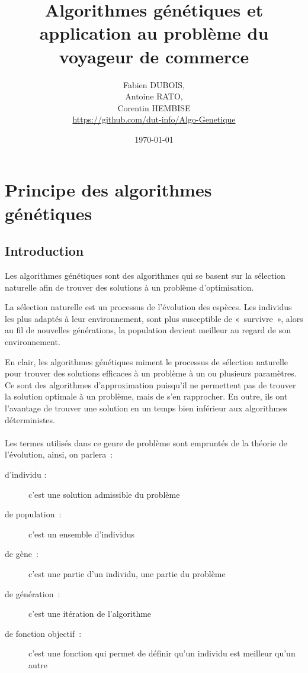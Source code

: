 \documentclass{article}
\begin{document}
\title{Algorithmes génétiques et application au problème du voyageur de commerce}
\author{Fabien DUBOIS,\\
   Antoine RATO,\\
   Corentin HEMBISE\\
   \url{https://github.com/dut-info/Algo-Genetique}\\}
\date{\today}

\maketitle

\tableofcontents

\newpage
\section{Principe des algorithmes génétiques}
	\subsection{Introduction}
	Les algorithmes génétiques sont des algorithmes qui se basent sur la sélection naturelle afin de trouver des solutions à un problème d'optimisation.

	La sélection naturelle est un processus de l'évolution des espèces. Les individus les plus adaptés à leur environnement, sont plus susceptible de « survivre », alors au fil de nouvelles générations, la population devient meilleur au regard de son environnement.

	En clair, les algorithmes génétiques miment le processus de sélection naturelle pour trouver des solutions efficaces à un problème à un ou plusieurs paramètres.
	Ce sont des algorithmes d'approximation puisqu'il ne permettent pas de trouver la solution optimale à un problème, mais de s'en rapprocher. En outre, ils ont l'avantage de trouver une solution en un temps bien inférieur aux algorithmes déterministes.

    \paragraph{}
	Les termes utilisés dans ce genre de problème sont empruntés de la théorie de l'évolution, ainsi, on parlera :
	\begin{description}
	\item [d'individu :] c'est une solution admissible du problème
	\item [de population :] c'est un ensemble d'individus
	\item [de gène :] c'est une partie d'un individu, une partie du problème
	\item [de génération :] c'est une itération de l'algorithme
	\item [de fonction objectif :] c'est une fonction qui permet de définir qu'un individu est meilleur qu'un autre
	\end{description}
\end{document}
